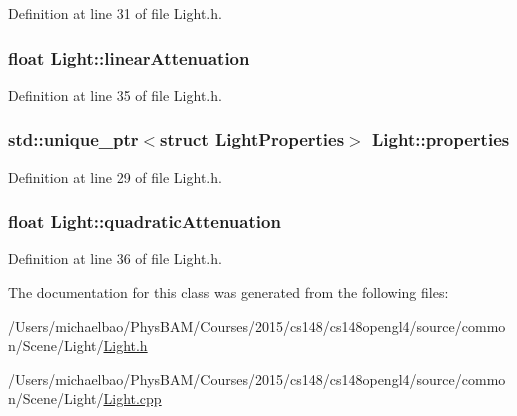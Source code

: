 Definition at line 31 of file Light.\+h.

\hypertarget{class_light_afcb2da592197efae015ae16c1c5bfceb}{}
\subsubsection[{linear\+Attenuation}]{\setlength{\rightskip}{0pt plus 5cm}float Light\+::linear\+Attenuation\hspace{0.3cm}{\ttfamily [private]}}\label{class_light_afcb2da592197efae015ae16c1c5bfceb}


Definition at line 35 of file Light.\+h.

\hypertarget{class_light_a74eba4cac1cc27e741230fbda32fceef}{}
\subsubsection[{properties}]{\setlength{\rightskip}{0pt plus 5cm}std\+::unique\+\_\+ptr$<$struct {\bf Light\+Properties}$>$ Light\+::properties\hspace{0.3cm}{\ttfamily [private]}}\label{class_light_a74eba4cac1cc27e741230fbda32fceef}


Definition at line 29 of file Light.\+h.

\hypertarget{class_light_a0f24dde11cbbd12d0f0309e189f3640c}{}
\subsubsection[{quadratic\+Attenuation}]{\setlength{\rightskip}{0pt plus 5cm}float Light\+::quadratic\+Attenuation\hspace{0.3cm}{\ttfamily [private]}}\label{class_light_a0f24dde11cbbd12d0f0309e189f3640c}


Definition at line 36 of file Light.\+h.



The documentation for this class was generated from the following files\+:\begin{DoxyCompactItemize}
\item 
/\+Users/michaelbao/\+Phys\+B\+A\+M/\+Courses/2015/cs148/cs148opengl4/source/common/\+Scene/\+Light/\hyperlink{_light_8h}{Light.\+h}\item 
/\+Users/michaelbao/\+Phys\+B\+A\+M/\+Courses/2015/cs148/cs148opengl4/source/common/\+Scene/\+Light/\hyperlink{_light_8cpp}{Light.\+cpp}\end{DoxyCompactItemize}
